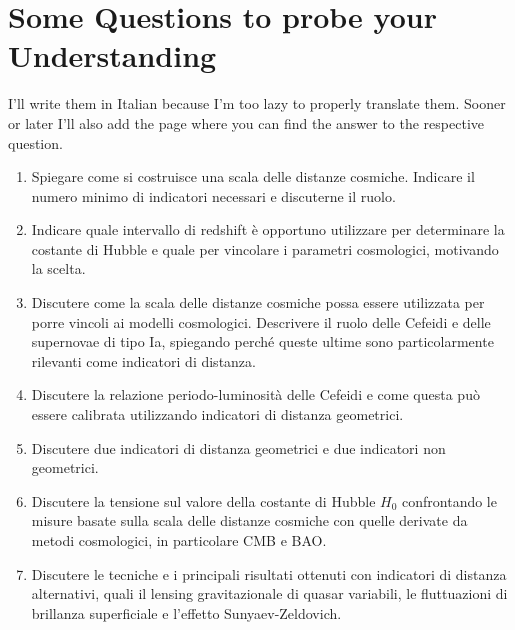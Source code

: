 \newpage
\section*{Some Questions to probe your Understanding}

I'll write them in Italian because I'm too lazy to properly translate them. Sooner or later I'll also add the page where you can find the answer to the respective question.

\begin{enumerate}
    \item  Spiegare come si costruisce una scala delle distanze cosmiche. Indicare il numero minimo di indicatori necessari e discuterne il ruolo.
    \item Indicare quale intervallo di redshift è opportuno utilizzare per determinare la costante di Hubble e quale per vincolare i parametri cosmologici, motivando la scelta.
    \item Discutere come la scala delle distanze cosmiche possa essere utilizzata per porre vincoli ai modelli cosmologici. Descrivere il ruolo delle Cefeidi e delle supernovae di tipo Ia, spiegando perché queste ultime sono particolarmente rilevanti come indicatori di distanza.
    \item Discutere la relazione periodo-luminosità delle Cefeidi e come questa può essere calibrata utilizzando indicatori di distanza geometrici.
    \item Discutere due indicatori di distanza geometrici e due indicatori non geometrici.
    \item Discutere la tensione sul valore della costante di Hubble $H_{0}$ confrontando le misure basate sulla scala delle distanze cosmiche con quelle derivate da metodi cosmologici, in particolare CMB e BAO.
    \item  Discutere le tecniche e i principali risultati ottenuti con indicatori di distanza alternativi, quali il lensing gravitazionale di quasar variabili, le fluttuazioni di brillanza superficiale e l’effetto Sunyaev-Zeldovich.
\end{enumerate}